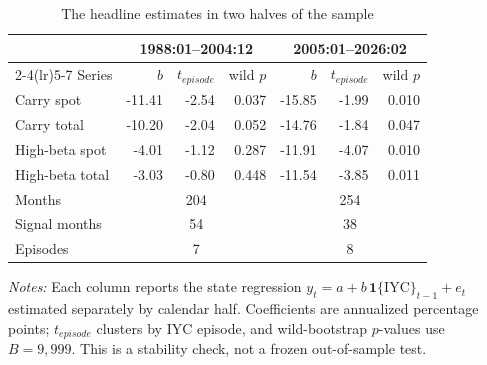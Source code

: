 \begin{table}[H]
\centering
\caption{The headline estimates in two halves of the sample}\label{tab:inherited-halves}
\small
\begin{tabular}{lrrrrrr}
\toprule
& \multicolumn{3}{c}{1988:01--2004:12} & \multicolumn{3}{c}{2005:01--2026:02} \\
\cmidrule(lr){2-4}\cmidrule(lr){5-7}
Series & $b$ & $t_{episode}$ & wild $p$ & $b$ & $t_{episode}$ & wild $p$ \\
\midrule
Carry spot       & -11.41 & -2.54 & 0.037 & -15.85 & -1.99 & 0.010 \\
Carry total      & -10.20 & -2.04 & 0.052 & -14.76 & -1.84 & 0.047 \\
High-beta spot   &  -4.01 & -1.12 & 0.287 & -11.91 & -4.07 & 0.010 \\
High-beta total  &  -3.03 & -0.80 & 0.448 & -11.54 & -3.85 & 0.011 \\
\midrule
Months           & \multicolumn{3}{c}{204} & \multicolumn{3}{c}{254} \\
Signal months    & \multicolumn{3}{c}{54}  & \multicolumn{3}{c}{38} \\
Episodes         & \multicolumn{3}{c}{7}   & \multicolumn{3}{c}{8} \\
\bottomrule
\end{tabular}

\vspace{0.35em}
\begin{minipage}{0.94\textwidth}
\footnotesize\emph{Notes:} Each column reports the state regression $y_t=a+b\,\mathbf{1}\{\mathrm{IYC}\}_{t-1}+e_t$ estimated separately by calendar half. Coefficients are annualized percentage points; $t_{episode}$ clusters by IYC episode, and wild-bootstrap $p$-values use $B=9{,}999$. This is a stability check, not a frozen out-of-sample test.
\end{minipage}
\end{table}
